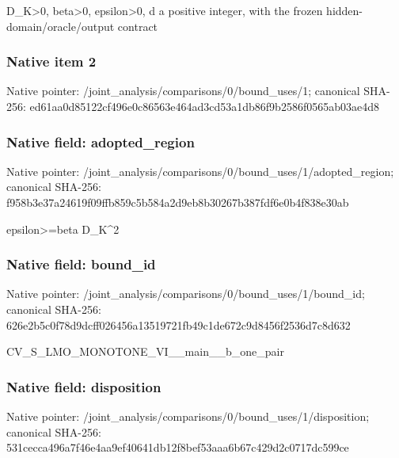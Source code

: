 \documentclass[10pt,a4paper]{article}
\begin{document}
\begingroup\raggedright\sloppy D\_\allowbreak{}K>0,\allowbreak{} beta>0,\allowbreak{} epsilon>0,\allowbreak{} d a positive integer,\allowbreak{} with the frozen hidden-domain/\allowbreak{}oracle/\allowbreak{}output contract\par\endgroup

\subsubsection{Native item 2}
Native pointer: /joint\_\allowbreak{}analysis/comparisons/0/bound\_\allowbreak{}uses/1; canonical SHA-256: ed61aa0d85122cf496e0c86563e464ad3cd53a1db86f9b2586f0565ab03ae4d8

\subsubsection{Native field: adopted\_\allowbreak{}region}
Native pointer: /joint\_\allowbreak{}analysis/comparisons/0/bound\_\allowbreak{}uses/1/adopted\_\allowbreak{}region; canonical SHA-256: f958b3e37a24619f09ffb859c5b584a2d9eb8b30267b387fdf6e0b4f838e30ab

\begingroup\raggedright\sloppy epsilon>=\allowbreak{}beta D\_\allowbreak{}K\textasciicircum{}2\par\endgroup

\subsubsection{Native field: bound\_\allowbreak{}id}
Native pointer: /joint\_\allowbreak{}analysis/comparisons/0/bound\_\allowbreak{}uses/1/bound\_\allowbreak{}id; canonical SHA-256: 626e2b5c0f78d9dcff026456a13519721fb49c1de672c9d8456f2536d7c8d632

\begingroup\raggedright\sloppy CV\_\allowbreak{}S\_\allowbreak{}LMO\_\allowbreak{}MONOTONE\_\allowbreak{}VI\_\allowbreak{}\_\allowbreak{}main\_\allowbreak{}\_\allowbreak{}b\_\allowbreak{}one\_\allowbreak{}pair\par\endgroup

\subsubsection{Native field: disposition}
Native pointer: /joint\_\allowbreak{}analysis/comparisons/0/bound\_\allowbreak{}uses/1/disposition; canonical SHA-256: 531cecca496a7f46e4aa9ef40641db12f8bef53aaa6b67c429d2c0717dc599ce
\end{document}
